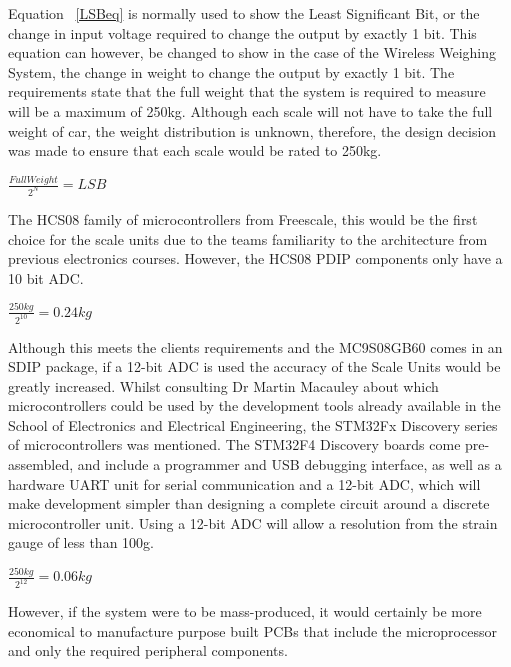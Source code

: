 Equation ~\ref{LSBeq} is normally used to show the Least Significant Bit, or the change in input voltage required to change the output by exactly 1 bit. This equation can however, be changed to show in the case of the Wireless Weighing System, the change in weight to change the output by exactly 1 bit.
The requirements state that the full weight that the system is required to measure will be a maximum of 250kg. Although each scale will not have to take the full weight of car, the weight distribution is unknown, therefore, the design decision was made to ensure that each scale would be rated to 250kg.  \\

\centerline{$\frac{Full Weight}{2^{N}} = LSB$}  \label{LSBeq2}

The HCS08 family of microcontrollers from Freescale, this would be the first choice for the scale units due to the teams familiarity to the architecture from previous electronics courses. However, the HCS08 \cite{HCS08} PDIP components only have a 10 bit ADC.\\

\centerline{$\frac{250kg}{2^{10}} = 0.24kg$} \label{LSBeq3}

Although this meets the clients requirements and the MC9S08GB60 \cite{MC9S08GB60} comes in an SDIP package, if a 12-bit ADC is used the accuracy of the Scale Units would be greatly increased. Whilst consulting Dr Martin Macauley about which microcontrollers could be used by the development tools already available in the School of Electronics and Electrical Engineering, the STM32Fx Discovery series of microcontrollers was mentioned. The STM32F4 Discovery \cite{STM32F4} boards come pre-assembled, and include a programmer and USB debugging interface, as well as a hardware UART unit for serial communication and a 12-bit ADC, which will make development simpler than designing a complete circuit around a discrete microcontroller unit.  Using a 12-bit ADC will allow a resolution from the strain gauge of less than 100g. 
\\

\centerline{$\frac{250kg}{2^{12}} = 0.06kg$}

However, if the system were to be mass-produced, it would certainly be more economical to manufacture purpose built PCBs that include the microprocessor and only the required peripheral components. 
